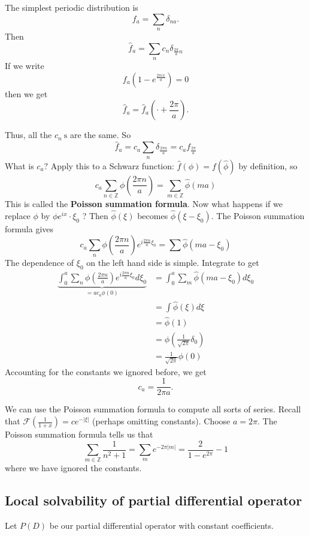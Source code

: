 \begin{example}
    The simplest periodic distribution is
    $$
    f_{a}=\sum_{n} \delta_{n a}.
    $$
    Then
$$
\widehat{f}_{a}=\sum_{n} c_{n} \delta_{\frac{2 \pi}{a} n}
$$
If we write
$$
f_{a}\left(1-e^{\frac{2 \pi i x}{a}}\right)=0
$$
then we get
$$
\widehat{f}_{a}=\widehat{f}_{a}\left(\cdot+\frac{2 \pi}{a}\right) .
$$

Thus, all the $c_{n} \mathrm{~s}$ are the same. So
$$
\widehat{f}_{a}=c_{a} \sum_{n} \delta_{\frac{2 \pi n}{a}}=c_{a} f_{\frac{2 \pi}{a}}
$$
What is $c_{a} ?$ Apply this to a Schwarz function: $\widehat{f}(\phi)=f(\widehat{\phi})$ by definition, so
$$
c_{a} \sum_{n \in \mathbb{Z}} \phi\left(\frac{2 \pi n}{a}\right)=\sum_{m \in \mathbb{Z}} \widehat{\phi}(m a)
$$
This is called the \textbf{Poisson summation formula}.
Now what happens if we replace $\phi$ by $\phi e^{i x} \cdot \xi_{0}$ ? Then $\widehat{\phi}(\xi)$ becomes $\widehat{\phi}\left(\xi-\xi_{0}\right)$. The Poisson summation formula gives
$$
c_{a} \sum_{n} \phi\left(\frac{2 \pi n}{a}\right) e^{i \frac{2 \pi n}{a} \xi_{0}}=\sum \widehat{\phi}\left(m a-\xi_{0}\right)
$$
The dependence of $\xi_{0}$ on the left hand side is simple. Integrate to get
$$
\begin{aligned}
\underbrace{\int_{0}^{a} \sum_{n} \phi\left(\frac{2 \pi n}{a}\right) e^{i \frac{2 \pi n}{a} \xi_{0}} d \xi_{0}}_{=a c_{a} \phi(0)} &=\int_{0}^{a} \sum_{m} \widehat{\phi}\left(m a-\xi_{0}\right) d \xi_{0} \\
&=\int \widehat{\phi}(\xi) d \xi \\
&=\widehat{\phi}(1) \\
&=\phi\left(\frac{1}{\sqrt{2 \pi}} \delta_{0}\right)\\
&=\frac{1}{\sqrt{2\pi}} \phi(0)
\end{aligned}
$$
Accounting for the constants we ignored before, we get
$$
c_{a}=\frac{1}{2 \pi a} .
$$
\end{example}

\begin{remark}
    We can use the Poisson summation formula to compute all sorts of series. Recall that $\mathcal{F}\left(\frac{1}{1+x}\right)=c e^{-|\xi|}$ (perhaps omitting constants). Choose $a=2 \pi$. The Poisson summation formula tells us that
    $$
    \sum_{m \in \mathbb{Z}} \frac{1}{n^{2}+1}=\sum_{m} e^{-2 \pi|m|}=\frac{2}{1-e^{2 \pi}}-1
    $$
    where we have ignored the constants.
\end{remark}

\subsection{Local solvability of partial differential operator}
Let $P(D)$ be our partial differential operator with constant coefficients.

